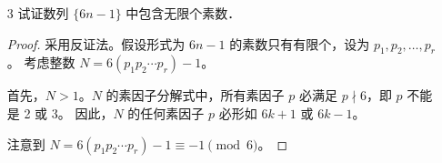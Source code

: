 \begin{enumerate}
\begin{proof}
        因此，Euler 乘积 $\sum_{m \in M_K} \frac{1}{m} = \prod_{k=K+1}^\infty (1 - \frac{1}{p_k})^{-1} = \frac{1}{P_K'}$ 收敛到一个有限值 $V_K$。
        
        现在，令 $P_K = p_1 p_2 \cdots p_K$ 为前 $K$ 个素数的乘积。考虑形如 $1 + q P_K$ 的整数，其中 $q = 1, 2, 3, \dots$。

        任何 $1 + q P_K$ 的素因子 $p$ 必须满足 $p \nmid P_K$，否则 $p \mid q P_K$ 且 $p \mid (1 + q P_K)$，这意味着 $p \mid 1$，这是不可能的。

        因此，$1 + q P_K$ 的所有素因子都大于 $p_K$，即 $1 + q P_K \in M_K$ 对所有 $q \ge 1$ 成立。
        
        于是，我们有级数不等式：
        \[ \sum_{q=1}^\infty \frac{1}{1 + q P_K} \le \sum_{m \in M_K} \frac{1}{m} = V_K \]
        这表明，如果 $\sum_p \frac{1}{p}$ 收敛，则级数 $\sum_{q=1}^\infty \frac{1}{1 + q P_K}$ 必须收敛。
        
        然而，我们使用极限比较判别法，将级数 $\sum_{q=1}^\infty \frac{1}{1 + q P_K}$ 与发散的调和级数 $\sum_{q=1}^\infty \frac{1}{q}$ 进行比较：
        \[ \lim_{q \to \infty} \frac{\frac{1}{1 + q P_K}}{\frac{1}{q}} = \lim_{q \to \infty} \frac{q}{1 + q P_K} = \frac{1}{P_K} \]
        由于 $P_K = p_1 \cdots p_K \ge 2$，极限值 $\frac{1}{P_K}$ 是一个正的有限常数。

        因为调和级数 $\sum_{q=1}^\infty \frac{1}{q}$ 发散，根据极限比较判别法，级数 $\sum_{q=1}^\infty \frac{1}{1 + q P_K}$ 也必须发散。
        
        这与我们从“$\sum_p \frac{1}{p}$ 收敛”这一假设推导出的结论“$\sum_{q=1}^\infty \frac{1}{1 + q P_K}$ 收敛”相矛盾。
        
        因此，最初的假设“$\sum_p \frac{1}{p}$ 收敛”必定是错误的。这意味着级数 $\sum_p \frac{1}{p}$ 不满足 Cauchy 准则，故该级数发散。
        证毕。
    \end{proof}

    \item[3] 试证数列 $\{6 n-1\}$ 中包含无限个素数．
    \begin{proof}
        采用反证法。假设形式为 $6n-1$ 的素数只有有限个，设为 $p_1, p_2, \ldots, p_r$。
        考虑整数 $N = 6(p_1 p_2 \cdots p_r) - 1$。
        
        首先，$N > 1$。$N$ 的素因子分解式中，所有素因子 $p$ 必满足 $p \nmid 6$，即 $p$ 不能是 2 或 3。
        因此，$N$ 的任何素因子 $p$ 必形如 $6k+1$ 或 $6k-1$。
        
        注意到 $N = 6(p_1 p_2 \cdots p_r) - 1 \equiv -1 \pmod 6$。
        

\end{proof}
\end{enumerate}
